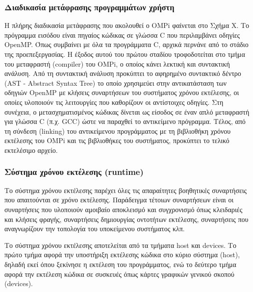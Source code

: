 
\subsubsection{Διαδικασία μετάφρασης προγραμμάτων χρήστη}
Η πλήρης διαδικασία μετάφρασης που ακολουθεί ο OMPi φαίνεται στο Σχήμα Χ. Το πρόγραμμα εισόδου είναι πηγαίος κώδικας σε γλώσσα C που περιλαμβάνει οδηγίες OpenMP. Όπως συμβαίνει με όλα τα προγράμματα C, αρχικά περνάνε από το στάδιο της προεπεξεργασίας. Η έξοδος αυτού του πρώτου σταδίου τροφοδοτείται στο τμήμα του μεταφραστή (compiler) του OMPi, ο οποίος κάνει λεκτική και συντακτική ανάλυση. Από τη συντακτική ανάλυση προκύπτει το αφηρημένο συντακτικό δέντρο (AST - Abstract Syntax Tree) το οποίο χρησιμεύει στην αντικατάσταση των οδηγιών OpenMP με κλήσεις συναρτήσεων του συστήματος χρόνου εκτέλεσης, οι οποίες υλοποιούν τις λειτουργίες που καθορίζουν οι αντίστοιχες οδηγίες. Στη συνέχεια, ο μετασχηματισμένος κώδικας δίνεται ως είσοδος σε έναν απλό μεταφραστή για γλώσσα C (π.χ. GCC) ώστε να παραχθεί το αντικείμενο πρόγραμμα. Τέλος, από τη σύνδεση (linking) του αντικείμενου προγράμματος με τη βιβλιοθήκη χρόνου εκτέλεσης του OMPi και τις βιβλιοθήκες του συστήματος, προκύπτει το τελικό εκτελέσιμο αρχείο.

\subsubsection{Σύστημα χρόνου εκτέλεσης (runtime)}
Το σύστημα χρόνου εκτέλεσης παρέχει όλες τις απαραίτητες βοηθητικές συναρτήσεις που απαιτούνται σε χρόνο εκτέλεσης. Παράδειγμα τέτοιων συναρτήσεων είναι οι συναρτήσεις που υλοποιούν αμοιβαίο αποκλεισμό και συγχρονισμό όπως κλειδαριές και κλήσεις φραγής, συναρτήσεις δημιουργίας οντοτήτων εκτέλεσης, συναρτήσεις που αναγνωρίζουν την τοπολογία του υποκείμενου συστήματος κλπ.

Το σύστημα χρόνου εκτέλεσης αποτελείται από τα τμήματα host και devices. Το πρώτο τμήμα αφορά την υποστήριξη εκτέλεσης κώδικα στο κύριο σύστημα (host), δηλαδή εκεί όπου ξεκίνησε η εκτέλεση του προγράμματος, ενώ το δεύτερο τμήμα αφορά την εκτέλεση κώδικα σε συσκευές όπως κάρτες γραφικών γενικού σκοπού (devices).

